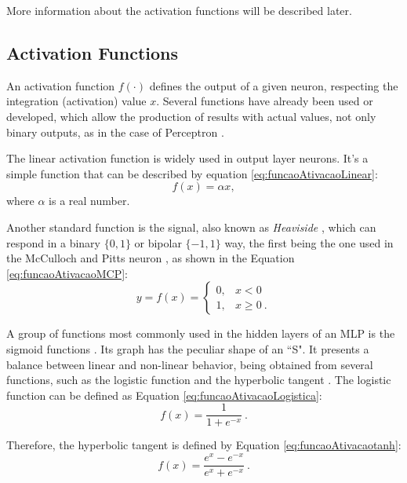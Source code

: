 More information about the activation functions will be described
later.

\subsection{Activation Functions}
\label{ssec:ativacao}

An activation function $f(\cdot)$ defines the output of a given neuron, respecting the integration (activation) value $x$. Several functions have already been used or developed, which allow the production of results with actual values, not only binary outputs, as in the case of Perceptron \cite{haykin}. %

The linear activation function is widely used in output layer neurons. It's a simple function that can be described by equation \ref{eq:funcaoAtivacaoLinear}:
\begin{equation}
	\label{eq:funcaoAtivacaoLinear}
	f(x) = \alpha x,
\end{equation}
where $\alpha$ is a real number.

Another standard function is the signal, also known as \textit{Heaviside} \cite{haykin}, which can respond in a binary $\{0, 1\}$ or bipolar $\{-1, 1\}$ way, the first being the one used in the McCulloch and Pitts neuron \cite{McCulloch1990}, as shown in the Equation \ref{eq:funcaoAtivacaoMCP}:
\begin{equation}
	\label{eq:funcaoAtivacaoMCP}
	y = f(x) = \left\{\begin{matrix}
		0, & x < 0    \\
		1, & x \geq 0 \: .
	\end{matrix}\right.
\end{equation}

A group of functions most commonly used in the hidden layers of an MLP is the sigmoid functions \cite{haykin, Castro2006FundamentalsON}. Its graph has the peculiar shape of an ``S". It presents a balance between linear and non-linear behavior, being obtained from several functions, such as the logistic function and the hyperbolic tangent \cite{Jeffrey2008}. The logistic function can be defined as Equation \ref{eq:funcaoAtivacaoLogistica}:
\begin{equation}
	\label{eq:funcaoAtivacaoLogistica}
	f(x) = \frac{1}{1 + e^{-x}}\:.
\end{equation}

Therefore, the hyperbolic tangent is defined by Equation \ref{eq:funcaoAtivacaotanh}:
\begin{equation}
\label{eq:funcaoAtivacaotanh}
	f(x) = \frac{e^x - e^{-x}}{e^x + e^{-x}}\:.
\end{equation}

